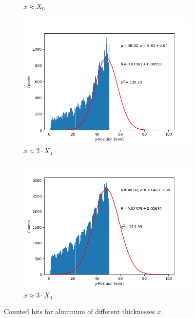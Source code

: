 \documentclass[sn-mathphys-num,iicol]{sn-jnl}
\theoremstyle{thmstyleone}
\theoremstyle{thmstyletwo}
\theoremstyle{thmstylethree}
\begin{document}
\begin{figure}[h]
\begin{subfigure}{0.49\textwidth}
        \caption{$x\approx X_0$}
    \end{subfigure}
    \begin{subfigure}{0.49\textwidth}
        \includegraphics[width=\textwidth]{../src/elsa/finished_plots/Aluminium, Two Radiation Lengths, 40cm Distance.png}
        \caption{$x\approx2\cdot X_0$}
    \end{subfigure}
    \begin{subfigure}{0.49\textwidth}
        \includegraphics[width=\textwidth]{../src/elsa/finished_plots/Aluminium, Three Radiation Lengths, 40cm Distance.png}
        \caption{$x\approx3\cdot X_0$}
    \end{subfigure}
    \caption{Counted hits for alumnium of different thicknesses $x$.}
    \label{fig:alu_gaus}
\end{figure}
\end{document}
